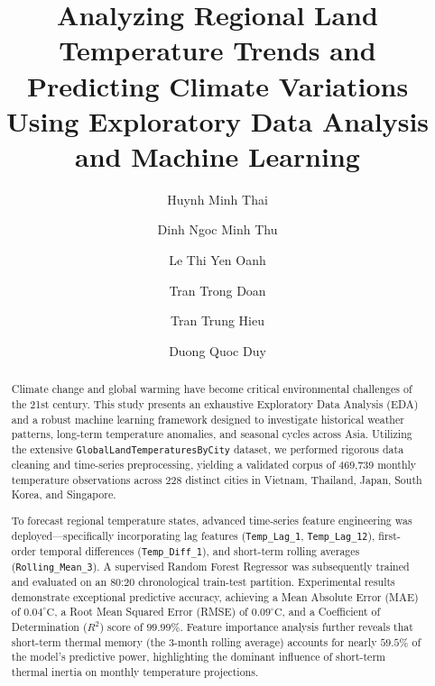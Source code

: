 \documentclass[runningheads]{llncs}
\begin{document}
%
\title{Analyzing Regional Land Temperature Trends and Predicting Climate Variations Using Exploratory Data Analysis and Machine Learning}
%
\author{
Huynh Minh Thai \and
Dinh Ngoc Minh Thu \and
Le Thi Yen Oanh \and
Tran Trong Doan \and
Tran Trung Hieu \and
Duong Quoc Duy
}


%
\maketitle
%

\begin{abstract}
Climate change and global warming have become critical environmental challenges of the 21st century. This study presents an exhaustive Exploratory Data Analysis (EDA) and a robust machine learning framework designed to investigate historical weather patterns, long-term temperature anomalies, and seasonal cycles across Asia. Utilizing the extensive \texttt{GlobalLandTemperaturesByCity} dataset, we performed rigorous data cleaning and time-series preprocessing, yielding a validated corpus of 469,739 monthly temperature observations across 228 distinct cities in Vietnam, Thailand, Japan, South Korea, and Singapore. 

To forecast regional temperature states, advanced time-series feature engineering was deployed—specifically incorporating lag features (\texttt{Temp\_Lag\_1}, \texttt{Temp\_Lag\_12}), first-order temporal differences (\texttt{Temp\_Diff\_1}), and short-term rolling averages (\texttt{Rolling\_Mean\_3}). A supervised Random Forest Regressor was subsequently trained and evaluated on an 80:20 chronological train-test partition. Experimental results demonstrate exceptional predictive accuracy, achieving a Mean Absolute Error (MAE) of $0.04^\circ\text{C}$, a Root Mean Squared Error (RMSE) of $0.09^\circ\text{C}$, and a Coefficient of Determination ($R^2$) score of $99.99\%$. Feature importance analysis further reveals that short-term thermal memory (the 3-month rolling average) accounts for nearly $59.5\%$ of the model's predictive power, highlighting the dominant influence of short-term thermal inertia on monthly temperature projections.

\end{abstract}
\end{document}
